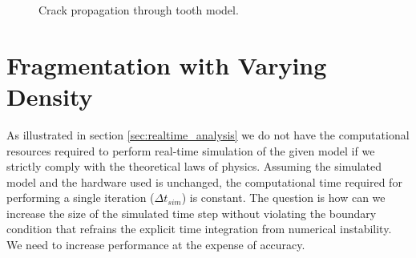 \begin{figure}
\begin{minipage}[b]{0.5\linewidth}
{  \label{fig:tooth_crack_propagation_3}}
  \end{minipage}
  \newline
  \begin{minipage}[b]{0.5\linewidth}
    \centering
  \end{minipage}
  \begin{minipage}[b]{0.5\linewidth}
    \centering
  \end{minipage}
  \caption{Crack propagation through tooth model.}
  \label{fig:tooth_crack_propagation}
\end{figure}


\section{Fragmentation with Varying Density}
\label{sec:fragmentation_with_varying_density}
As illustrated in section \vref{sec:realtime_analysis} we do
not have the computational resources required to perform real-time
simulation of the given model if we strictly comply with the
theoretical laws of physics.
%
Assuming the simulated model and the hardware used is unchanged, the
computational time required for performing a single iteration ($\Delta t_{sim}$) is
constant. 
%
The question is how can we increase the size of the simulated time step
without violating the boundary condition that refrains the explicit
time integration from numerical instability. We need to increase
performance at the expense of accuracy. \\


